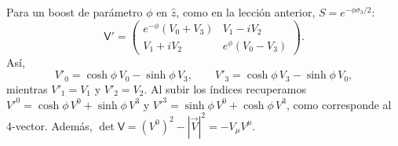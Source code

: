 \documentclass[11pt,a4paper]{article}
\begin{document}
Para un boost de parámetro $\phi$ en $\hat z$, como en la lección anterior,
$S=e^{-\phi\sigma_3/2}$:
\[
  \mathsf V'=
  \begin{pmatrix}
    e^{-\phi}(V_0+V_3)&V_1-iV_2\\
    V_1+iV_2&e^\phi(V_0-V_3)
  \end{pmatrix}.
\]
Así,
\[
  V'_0=\cosh\phi\,V_0-\sinh\phi\,V_3,
  \qquad
  V'_3=\cosh\phi\,V_3-\sinh\phi\,V_0,
\]
mientras $V'_1=V_1$ y $V'_2=V_2$. Al subir los índices recuperamos
$V'^0=\cosh\phi\,V^0+\sinh\phi\,V^3$ y
$V'^3=\sinh\phi\,V^0+\cosh\phi\,V^3$, como corresponde al 4-vector.
Además, $\det\mathsf V=(V^0)^2-|\vec V|^2=-V_\mu V^\mu$.
\end{document}
